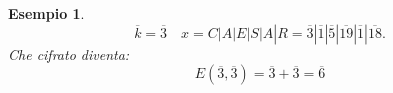 \documentclass{article}
\newtheorem{exmp}{Esempio}[section]
\begin{document}
\begin{exmp}
       \begin{equation*}
               \overline{k} = \overline{3} \quad x = C|A|E|S|A|R = \overline{3}|\overline{1}|\overline{5}|\overline{19}|\overline{1}|\overline{18}.
       \end{equation*}
       Che cifrato diventa:
       \begin{equation*}
               E(\overline{3}, \overline{3}) = \overline{3} + \overline{3} = \overline{6}
       \end{equation*}
\end{exmp}
\end{document}
